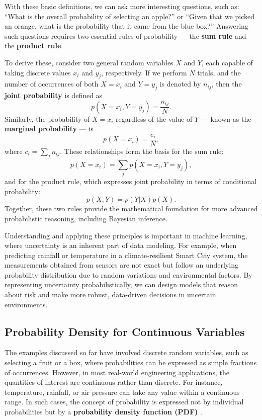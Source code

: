 \documentclass[12pt]{article}
\begin{document}
With these basic definitions, we can ask more interesting questions, such as:  
“What is the overall probability of selecting an apple?” or  
“Given that we picked an orange, what is the probability that it came from the blue box?”  
Answering such questions requires two essential rules of probability — the \textbf{sum rule} and the \textbf{product rule}.

To derive these, consider two general random variables \( X \) and \( Y \), each capable of taking discrete values \( x_i \) and \( y_j \), respectively. 
If we perform \( N \) trials, and the number of occurrences of both \( X = x_i \) and \( Y = y_j \) is denoted by \( n_{ij} \), then the \textbf{joint probability} is defined as
\[
p(X = x_i, Y = y_j) = \frac{n_{ij}}{N}.
\]
Similarly, the probability of \( X = x_i \) regardless of the value of \( Y \) — known as the \textbf{marginal probability} — is
\[
p(X = x_i) = \frac{c_i}{N},
\]
where \( c_i = \sum_j n_{ij} \).
These relationships form the basis for the sum rule:
\[
p(X = x_i) = \sum_j p(X = x_i, Y = y_j),
\]
and for the product rule, which expresses joint probability in terms of conditional probability:
\[
p(X, Y) = p(Y | X) p(X).
\]
Together, these two rules provide the mathematical foundation for more advanced probabilistic reasoning, including Bayesian inference.

Understanding and applying these principles is important in machine learning, where uncertainty is an inherent part of data modeling. 
For example, when predicting rainfall or temperature in a climate-resilient Smart City system, the measurements obtained from sensors are not exact but follow an underlying probability distribution due to random variations and environmental factors. 
By representing uncertainty probabilistically, we can design models that reason about risk and make more robust, data-driven decisions in uncertain environments.


\subsection{Probability Density for Continuous Variables}

The examples discussed so far have involved discrete random variables, such as selecting a fruit or a box, where probabilities can be expressed as simple fractions of occurrences. 
However, in most real-world engineering applications, the quantities of interest are continuous rather than discrete. 
For instance, temperature, rainfall, or air pressure can take any value within a continuous range. 
In such cases, the concept of probability is expressed not by individual probabilities but by a \textbf{probability density function (PDF)} \cite{bishop2006pattern}.
\end{document}
